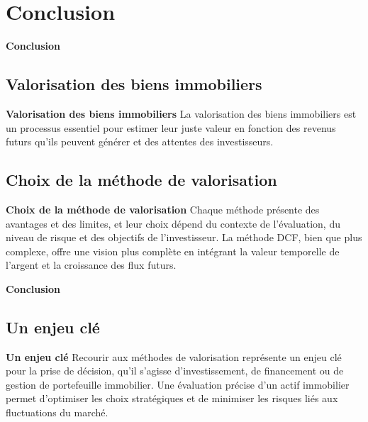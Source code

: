 \documentclass{beamer}
\begin{document}
\section{Conclusion}
\begin{frame}{\textbf{Conclusion}}
	\subsection{Valorisation des biens immobiliers}
	\begin{block}{\textbf{Valorisation des biens immobiliers}}
La valorisation des biens immobiliers est un processus essentiel pour estimer leur juste valeur en fonction des revenus futurs qu'ils peuvent générer et des attentes des investisseurs.
	\end{block}
\subsection{Choix de la méthode de valorisation}
	\begin{block}{\textbf{Choix de la méthode de valorisation}}
Chaque méthode présente des avantages et des limites, et leur choix dépend du contexte de l’évaluation, du niveau de risque et des objectifs de l’investisseur. La méthode DCF, bien que plus complexe, offre une vision plus complète en intégrant la valeur temporelle de l’argent et la croissance des flux futurs.
\end{block}
	
\end{frame}


\begin{frame}{\textbf{Conclusion}}
\subsection{Un enjeu clé}
\begin{block}{\textbf{Un enjeu clé}}
	Recourir aux méthodes de valorisation représente un enjeu clé pour la prise de décision, qu’il s’agisse d’investissement, de financement ou de gestion de portefeuille immobilier. Une évaluation précise d'un actif immobilier permet d'optimiser les choix stratégiques et de minimiser les risques liés aux fluctuations du marché.	
\end{block}	


\end{frame}
\end{document}
